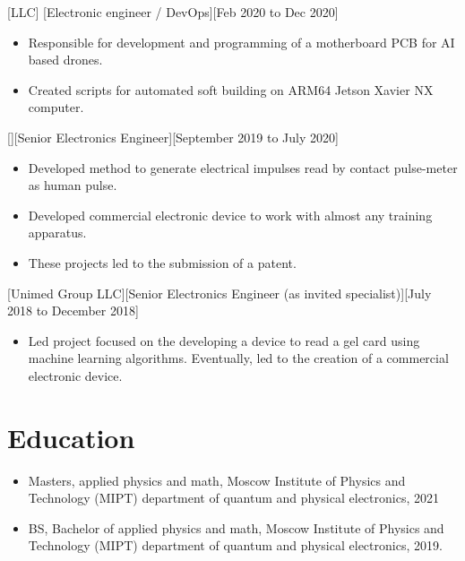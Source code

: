 \documentclass{article}
\begin{document}
 
[LLC]
[Electronic engineer / DevOps][Feb 2020 to Dec 2020]
 
\begin{itemize}
\item Responsible for development and programming of a motherboard PCB for AI based drones.
\item Created scripts for automated soft building on ARM64 Jetson Xavier NX computer.
\end{itemize}
 
 
[][Senior Electronics Engineer][September 2019 to July 2020]
 
\begin{itemize}
\item Developed method to generate electrical impulses read by contact pulse-meter as human pulse.
\item Developed commercial electronic device to work with almost any training apparatus.
\item These projects led to the submission of a patent.
\end{itemize}
 
[Unimed Group LLC][Senior Electronics Engineer (as invited specialist)][July 2018 to December 2018]
 
\begin{itemize}
\item Led project focused on the developing a device to read a gel card using machine learning algorithms. Eventually, led to the creation of a commercial electronic device.
\end{itemize}
 
 
\section{Education}
 
\begin{itemize}
\item Masters, applied physics and math, Moscow Institute of Physics and Technology (MIPT) department of quantum and physical electronics, 2021
\item BS, Bachelor of applied physics and math, Moscow Institute of Physics and Technology (MIPT) department of quantum and physical electronics, 2019.
\end{itemize}
\end{document}
